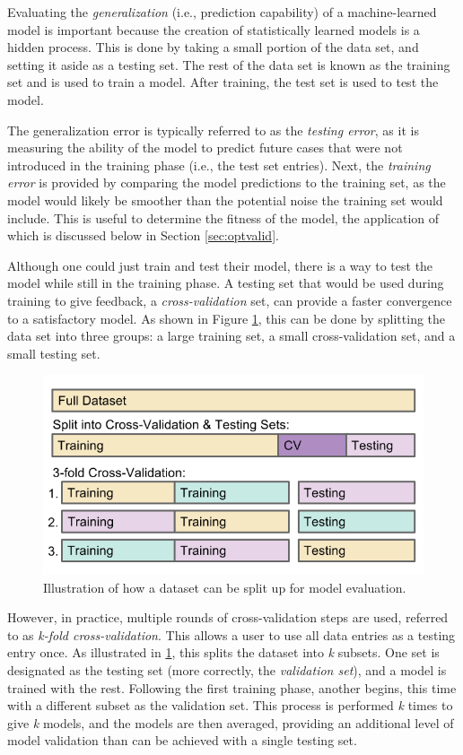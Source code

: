 Evaluating the \textit{generalization} (i.e., prediction capability) of a
machine-learned model is important because the creation of statistically
learned models is a hidden process. This is done by taking a small portion of
the data set, and setting it aside as a testing set.  The rest of the data set
is known as the training set and is used to train a model. After training, the
test set is used to test the model.  

The generalization error is typically referred to as the \textit{testing
error}, as it is measuring the ability of the model to predict future cases
that were not introduced in the training phase (i.e., the test set entries).
Next, the \textit{training error} is provided by comparing the model
predictions to the training set, as the model would likely be smoother than the
potential noise the training set would include. This is useful to determine the
fitness of the model, the application of which is discussed below in Section
\ref{sec:optvalid}.

Although one could just train and test their model, there is a way to test the
model while still in the training phase. A testing set that would be used
during training to give feedback, a \textit{cross-validation} set, can provide
a faster convergence to a satisfactory model. As shown in Figure
\ref{fig:cverror}, this can be done by splitting the data set into three
groups: a large training set, a small cross-validation set, and a small testing
set. 

\begin{figure}[!htb]
  \includegraphics[width=\linewidth]{./chapters/litrev/cverror.png}
  \caption{Illustration of how a dataset can be split up for model evaluation.}
  \label{fig:cverror}
\end{figure}

However, in practice, multiple rounds of cross-validation steps are used,
referred to as \textit{k-fold cross-validation}. This allows a user to use all
data entries as a testing entry once.  As illustrated in \ref{fig:cverror},
this splits the dataset into \textit{k} subsets. One set is designated as the
testing set (more correctly, the \textit{validation set}), and a model is
trained with the rest. Following the first training phase, another begins, this
time with a different subset as the validation set.  This process is performed
\textit{k} times to give \textit{k} models, and the models are then averaged,
providing an additional level of model validation than can be achieved with a
single testing set.

